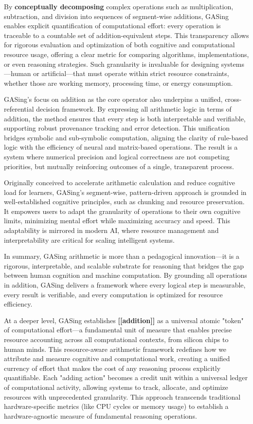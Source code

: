 \documentclass[11pt,a4paper]{article}
\begin{document}
By \textbf{conceptually decomposing} complex operations such as multiplication, subtraction, and division into sequences of segment-wise additions, GASing enables explicit quantification of computational effort: every operation is traceable to a countable set of addition-equivalent steps. This transparency allows for rigorous evaluation and optimization of both cognitive and computational resource usage, offering a clear metric for comparing algorithms, implementations, or even reasoning strategies. Such granularity is invaluable for designing systems—human or artificial—that must operate within strict resource constraints, whether those are working memory, processing time, or energy consumption.

GASing’s focus on addition as the core operator also underpins a unified, cross-referential decision framework. By expressing all arithmetic logic in terms of addition, the method ensures that every step is both interpretable and verifiable, supporting robust provenance tracking and error detection. This unification bridges symbolic and sub-symbolic computation, aligning the clarity of rule-based logic with the efficiency of neural and matrix-based operations. The result is a system where numerical precision and logical correctness are not competing priorities, but mutually reinforcing outcomes of a single, transparent process.

Originally conceived to accelerate arithmetic calculation and reduce cognitive load for learners, GASing’s segment-wise, pattern-driven approach is grounded in well-established cognitive principles, such as chunking and resource preservation. It empowers users to adapt the granularity of operations to their own cognitive limits, minimizing mental effort while maximizing accuracy and speed. This adaptability is mirrored in modern AI, where resource management and interpretability are critical for scaling intelligent systems.

In summary, GASing arithmetic is more than a pedagogical innovation—it is a rigorous, interpretable, and scalable substrate for reasoning that bridges the gap between human cognition and machine computation. By grounding all operations in addition, GASing delivers a framework where every logical step is measurable, every result is verifiable, and every computation is optimized for resource efficiency.

At a deeper level, GASing establishes \textbf{[[addition]]} as a universal atomic "token" of computational effort—a fundamental unit of measure that enables precise resource accounting across all computational contexts, from silicon chips to human minds. This resource-aware arithmetic framework redefines how we attribute and measure cognitive and computational work, creating a unified currency of effort that makes the cost of any reasoning process explicitly quantifiable. Each "adding action" becomes a credit unit within a universal ledger of computational activity, allowing systems to track, allocate, and optimize resources with unprecedented granularity. This approach transcends traditional hardware-specific metrics (like CPU cycles or memory usage) to establish a hardware-agnostic measure of fundamental reasoning operations.
\end{document}
